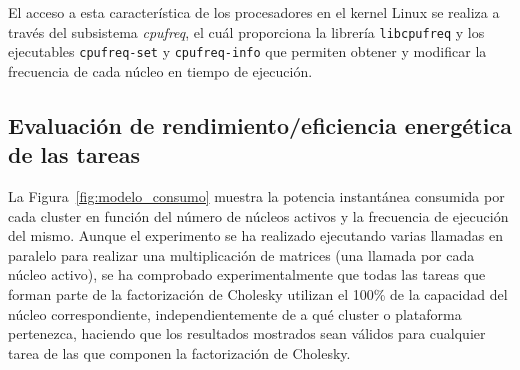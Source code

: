El acceso a esta característica de los procesadores en el kernel Linux se
realiza a través del subsistema \emph{cpufreq}, el cuál proporciona la
librería \texttt{libcpufreq} y los ejecutables \texttt{cpufreq-set} y
\texttt{cpufreq-info} que permiten obtener y modificar la frecuencia de
cada núcleo en tiempo de ejecución.

\subsection{Evaluación de rendimiento/eficiencia energética de las tareas}

La Figura~\ref{fig:modelo_consumo} muestra la potencia instantánea
consumida por cada cluster en función del número de núcleos activos y la
frecuencia de ejecución del mismo. Aunque el experimento se ha realizado
ejecutando varias llamadas en paralelo para realizar una multiplicación de
matrices (una llamada por cada núcleo activo), se ha comprobado
experimentalmente que todas las tareas que forman parte de la factorización
de Cholesky utilizan el 100\% de la capacidad del núcleo correspondiente,
independientemente de a qué cluster o plataforma pertenezca, haciendo que
los resultados mostrados sean válidos para cualquier tarea de las que
componen la factorización de Cholesky.

